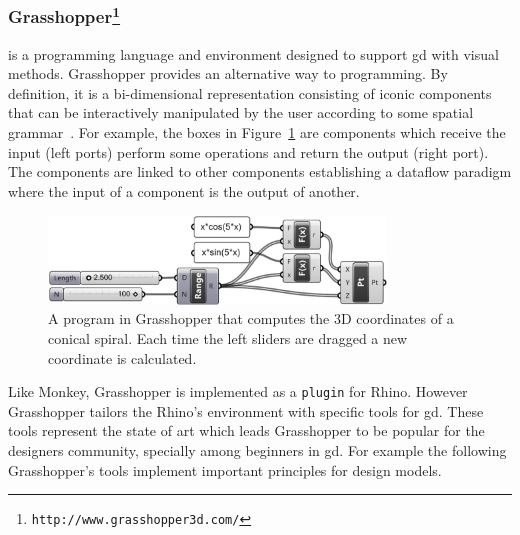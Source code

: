 \subsubsection{Grasshopper\protect\footnote{\texttt{http://www.grasshopper3d.com/}}} is a programming language and environment designed to support \ac{gd} with visual methods. Grasshopper provides an alternative way to programming. By definition, it is a bi-dimensional representation consisting of iconic components that can be interactively manipulated by the user according to some spatial grammar~\cite{myers1990taxonomies}. For example, the boxes in Figure~\ref{fig:grass} are components which receive the input (left ports) perform some operations and return the output (right port). The components are linked to other components establishing a dataflow paradigm where the input of a component is the output of another.

\begin{figure}[!htbp]
  \centering
  \includegraphics[width=0.8\textwidth]{img/grasshopper}
    \caption{A program in Grasshopper that computes the 3D coordinates of a conical spiral. Each time the left sliders are dragged a new coordinate is calculated.}
  \label{fig:grass}
\end{figure}

Like Monkey, Grasshopper is implemented as a \texttt{plugin} for Rhino\footnotemark[\ref{rhin}]. However Grasshopper tailors the Rhino's environment with specific tools for \ac{gd}. These tools represent the state of art which leads Grasshopper to be popular for the designers community, specially among beginners in \ac{gd}. For example the following Grasshopper's tools implement important principles for design models.

